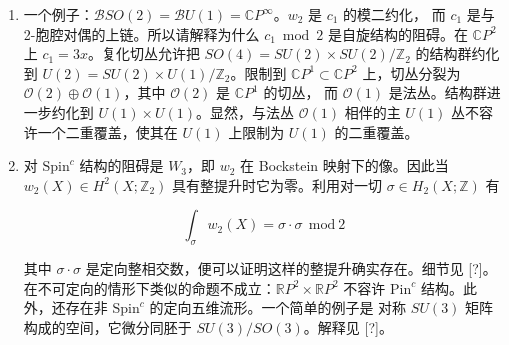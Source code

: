 \begin{enumerate}
    {\small\itshape ［原文标记：这一点仍然令人困惑，因为这些波函数并不延拓到圆盘上；上面的旋量函数是相对于
    $K^{1/2}$ 的一个不延拓到圆盘上的平凡化而言的。仍需更完整地解释。Witten 关于超弦微扰论的工作中
    也许有些好的评论。］}


    {\small\itshape ［原文标记：下面两个例子都假定 $X$ 是四维的］}


  \item 一个例子：$\mathcal{B}SO(2)=\mathcal{B}U(1)=\mathbb{C}P^\infty$。$w_2$ 是 $c_1$ 的模二约化，
    而 $c_1$ 是与 2-胞腔对偶的上链。所以请解释为什么 $c_1\bmod 2$ 是自旋结构的阻碍。在
    $\mathbb{C}P^2$ 上 $c_1=3x$。复化切丛允许把
    $SO(4)=SU(2)\times SU(2)/\mathbb{Z}_2$ 的结构群约化到
    $U(2)=SU(2)\times U(1)/\mathbb{Z}_2$。限制到 $\mathbb{C}P^1\subset\mathbb{C}P^2$ 上，切丛分裂为
    $\mathcal{O}(2)\oplus\mathcal{O}(1)$，其中 $\mathcal{O}(2)$ 是 $\mathbb{C}P^1$ 的切丛，
    而 $\mathcal{O}(1)$ 是法丛。结构群进一步约化到 $U(1)\times U(1)$。显然，与法丛
    $\mathcal{O}(1)$ 相伴的主 $U(1)$ 丛不容许一个二重覆盖，使其在 $U(1)$ 上限制为 $U(1)$ 的二重覆盖。

  \item 对 $\mathrm{Spin}^c$ 结构的阻碍是 $W_3$，即 $w_2$ 在 Bockstein 映射下的像。因此当
    $w_2(X)\in H^2(X;\mathbb{Z}_2)$ 具有整提升时它为零。利用对一切 $\sigma\in H_2(X;\mathbb{Z})$ 有

    \begin{equation}
      \int_\sigma w_2(X) = \sigma\cdot\sigma \ \ \mathrm{mod}\ 2
      \tag{G.16}
      \label{eq:G.16}
    \end{equation}

    其中 $\sigma\cdot\sigma$ 是定向整相交数，便可以证明这样的整提升确实存在。细节见 [?]。
    在不可定向的情形下类似的命题不成立：$\mathbb{R}P^2\times\mathbb{R}P^2$ 不容许
    $\mathrm{Pin}^c$ 结构。此外，还存在非 $\mathrm{Spin}^c$ 的定向五维流形。一个简单的例子是
    对称 $SU(3)$ 矩阵构成的空间，它微分同胚于 $SU(3)/SO(3)$。解释见 [?]。



\end{enumerate}
